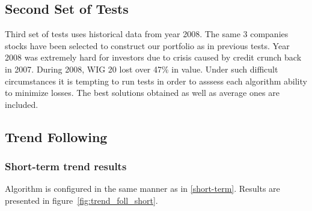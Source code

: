 \subsection{Second Set of Tests}

Third set of tests uses historical data from year 2008.
The same 3 companies stocks have been selected to construct our portfolio as in previous tests.
Year 2008 was extremely hard for investors due to crisis caused by credit crunch back in 2007.
During 2008, WIG 20 lost over 47\% in value.
Under such difficult circumstances it is tempting to run tests in order to asssess each algorithm ability to minimize losses.
The best solutions obtained as well as average ones are included.  

\subsection{Trend Following}

\subsubsection{Short-term trend results}

Algorithm is configured in the same manner as in \ref{short-term}.
Results are presented in figure~\ref{fig:trend_foll_short}.

